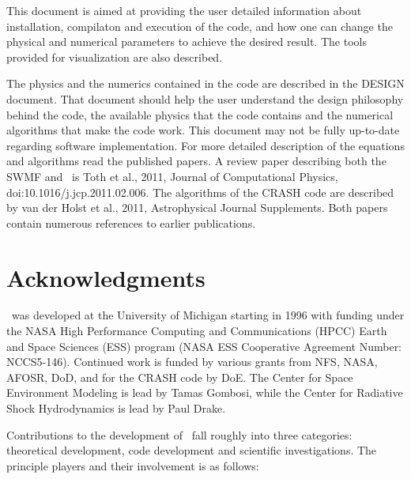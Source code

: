 This document is aimed at providing the user detailed information about
installation, compilaton and execution of the code, and 
how one can change the physical and numerical parameters
to achieve the desired result. The tools provided for visualization
are also described.

The physics and the numerics contained in the code are described in
the DESIGN document. That document should help
the user understand the design philosophy behind the code, the 
available physics that the code contains and the numerical algorithms that
make the code work. This document may not be fully up-to-date regarding
software implementation. For more detailed description of the equations 
and algorithms read the published papers. A review paper describing
both the SWMF and \BATSRUS\ is Toth et al., 2011, Journal of Computational
Physics, doi:10.1016/j.jcp.2011.02.006. The algorithms of the CRASH
code are described by van der Holst et al., 2011, Astrophysical Journal
Supplements. Both papers contain numerous references to earlier publications.

\section{Acknowledgments}

\BATSRUS\ was developed at the University of Michigan starting in 1996
with funding under the NASA High Performance Computing and Communications (HPCC)
Earth and Space Sciences (ESS) program (NASA ESS Cooperative Agreement 
Number: NCCS5-146).  Continued work is funded by various grants from
NFS, NASA, AFOSR, DoD, and for the CRASH code by DoE.
The Center for Space Environment Modeling is lead by Tamas Gombosi, while
the Center for Radiative Shock Hydrodynamics is lead by Paul Drake.

Contributions to the development of \BATSRUS\ fall roughly into three
categories: theoretical development, code development and scientific
investigations. The principle players and their involvement is as follows:

